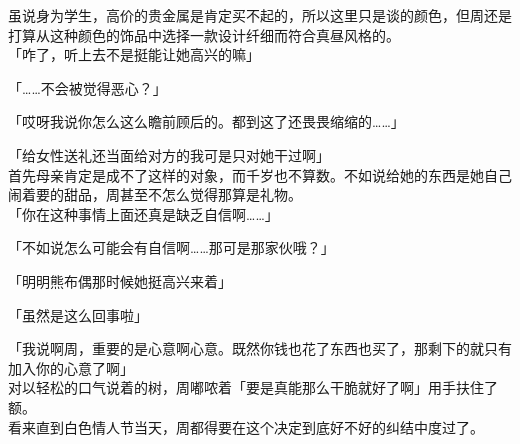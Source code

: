 虽说身为学生，高价的贵金属是肯定买不起的，所以这里只是谈的颜色，但周还是打算从这种颜色的饰品中选择一款设计纤细而符合真昼风格的。\\

「咋了，听上去不是挺能让她高兴的嘛」

「……不会被觉得恶心？」

「哎呀我说你怎么这么瞻前顾后的。都到这了还畏畏缩缩的……」

「给女性送礼还当面给对方的我可是只对她干过啊」\\

首先母亲肯定是成不了这样的对象，而千岁也不算数。不如说给她的东西是她自己闹着要的甜品，周甚至不怎么觉得那算是礼物。\\

「你在这种事情上面还真是缺乏自信啊……」

「不如说怎么可能会有自信啊……那可是那家伙哦？」

「明明熊布偶那时候她挺高兴来着」

「虽然是这么回事啦」

「我说啊周，重要的是心意啊心意。既然你钱也花了东西也买了，那剩下的就只有加入你的心意了啊」\\

对以轻松的口气说着的树，周嘟哝着「要是真能那么干脆就好了啊」用手扶住了额。\\

看来直到白色情人节当天，周都得要在这个决定到底好不好的纠结中度过了。
